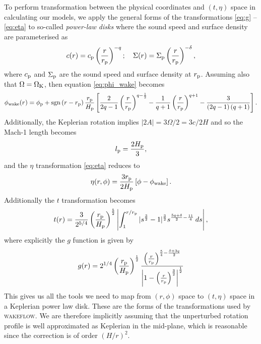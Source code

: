 To perform transformation between the physical coordinates and $(t,\eta)$ space in calculating our models, we apply the general forms of the transformations \ref{eq:g} -- \ref{eq:eta} to so-called \textit{power-law disks} where the sound speed and surface density are parameterised as
\begin{align}
    c(r) = c_{\rm p} \left(\frac{r}{r_{\rm p}}\right)^{-q}; \quad \Sigma(r) = \Sigma_{\rm p} \left(\frac{r}{r_{\rm p}}\right)^{-\delta},
\end{align}
where $c_{\rm p}$ and $\Sigma_{\rm p}$ are the sound speed and surface density at $r_{\rm p}$.
Assuming also that $\Omega=\Omega_{\rm K}$, then equation \ref{eq:phi_wake} becomes \citep{rafikov2002a}
\begin{align}
    \phi_{\rm wake}(r) = \phi_{\rm p} + {\rm sgn} \left( r - r_{\rm p} \right) \frac{r_{\rm p}}{H_{\rm p}} \left[ \frac{2}{2q-1} \left(\frac{r}{r_{\rm p}}\right)^{q-\frac{1}{2}} - \frac{1}{q+1} \left(\frac{r}{r_{\rm p}}\right)^{q+1} - \frac{3}{\left(2q-1\right)\left(q+1\right)} \right].
\end{align}
Additionally, the Keplerian rotation implies $|2A| = 3\Omega/2 = 3c/2H$ and so the Mach-1 length becomes
\begin{align}
    l_{\rm p} = \frac{2H_{\rm p}}{3},
\end{align}
and the $\eta$ transformation \ref{eq:eta} reduces to 
\begin{align}
    \eta(r, \phi) = \frac{3 r_{\rm p}}{2 H_{\rm p}} \left[ \phi - \phi_{\rm wake} \right].
\end{align}
Additionally the $t$ transformation becomes \citep{rafikov2002a}
\begin{align}
    t(r) = \frac{3}{2^{5/4}} \left( \frac{r_{\rm p}}{H_{\rm p}} \right)^{\frac{5}{2}} \left| \int_1^{r/r_{\rm p}} |s^\frac{3}{2} - 1|^\frac{3}{2} s^{\frac{5q+\delta}{2}-\frac{11}{4}}\, ds \right|, \label{eq:t_power}
\end{align}
where explicitly the $g$ function is given by \citep{bollati2021}
\begin{align}
    g(r) = 2^{1/4} \left( \frac{r_{\rm p}}{H_{\rm p}} \right)^{\frac{1}{2}} \frac{\left( \frac{r}{r_{\rm p}} \right)^{\frac{5}{4} - \frac{\delta + 3q}{2}}}{\left| 1 - \left(\frac{r}{r_{\rm p}}\right)^\frac{3}{2} \right|^\frac{1}{2}} \label{eq:g_power}
\end{align}
This gives us all the tools we need to map from $(r,\phi)$ space to $(t,\eta)$ space in a Keplerian power law disk.
These are the forms of the transformations used by \textsc{wakeflow}.
We are therefore implicitly assuming that the unperturbed rotation profile is well approximated as Keplerian in the mid-plane, which is reasonable since the correction is of order $\left(H/r\right)^2$.

